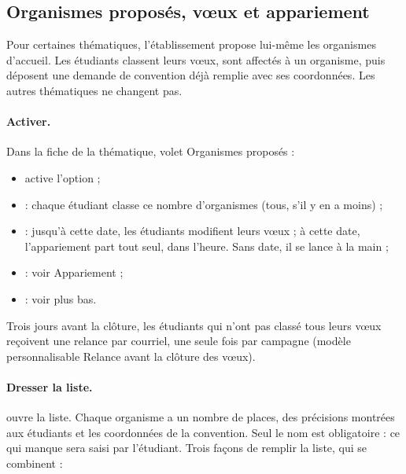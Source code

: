 \documentclass[11pt,a4paper]{article}
\begin{document}

\subsection{Organismes proposés, vœux et appariement}
\label{sec:organismes}

Pour certaines thématiques, l'établissement propose lui-même les organismes
d'accueil. Les étudiants classent leurs vœux, sont affectés à un organisme, puis
déposent une demande de convention déjà remplie avec ses coordonnées. Les autres
thématiques ne changent pas.

\paragraph{Activer.} Dans la fiche de la thématique, volet \og Organismes
proposés\fg{} :

\begin{itemize}
  \item {} active l'option ;
  \item {} : chaque étudiant classe ce nombre
        d'organismes (tous, s'il y en a moins) ;
  \item {} : jusqu'à cette date, les
        étudiants modifient leurs vœux ; à cette date, l'appariement part tout
        seul, dans l'heure. Sans date, il se lance à la main ;
  \item {} : voir \og Appariement\fg{} ;
  \item {} : voir plus bas.
\end{itemize}

Trois jours avant la clôture, les étudiants qui n'ont pas classé tous leurs vœux
reçoivent une relance par courriel, une seule fois par campagne (modèle
personnalisable \og Relance avant la clôture des vœux\fg{}).


\paragraph{Dresser la liste.}  ouvre la
liste. Chaque organisme a un nombre de places, des précisions montrées aux
étudiants et les coordonnées de la convention. Seul le nom est obligatoire : ce
qui manque sera saisi par l'étudiant. Trois façons de remplir la liste, qui se
combinent :
\end{document}

